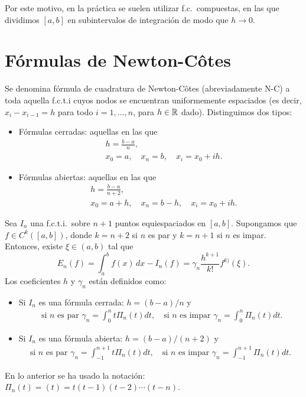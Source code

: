 Por este motivo, en la práctica se suelen utilizar f.c.\ compuestas, en
las que dividimos $[a,b]$ en subintervalos de integración de modo que
$h\to 0$.

\section{Fórmulas de Newton-Côtes}
\label{sec:formulas-de-newton}

\begin{definition}
  \label{def:1}
  Se denomina fórmula de cuadratura de Newton-Côtes (abreviadamente
  N-C) a toda aquella f.c.t.i cuyos nodos se encuentran
  uniformemente espaciados (es decir, $x_{i}-x_{i-1}=h$ para todo
  $i=1,\dots,n$, para $h\in\operatorname{{\mathbb R}}$ dado). Distinguimos dos tipos:
  \begin{itemize}
  \item Fórmulas cerradas: aquellas en las que
    \begin{align*}
      &h=\frac{b-a}{n}, \\
      &x_0=a, \quad x_n=b, \quad x_i=x_0 + i h.
    \end{align*}
  \item Fórmulas abiertas: aquellas en las que
    \begin{align*}
      &h=\frac{b-a}{n+2}, \\
      &x_0=a+h, \quad x_n=b- h, \quad x_i=x_0 + i h.
    \end{align*}
  \end{itemize}
\end{definition}

\begin{theorem}
  \label{thm:error.formulas-nc}
  Sea $I_n$ una f.c.t.i.\ sobre $n+1$ puntos equiespaciados en
  $[a,b]$. Supongamos que $f\in C^k([a,b])$, donde $k=n+2$ si $n$ es par
  y $k=n+1$ si $n$ es impar. Entonces, existe $\xi\in(a,b)$ tal que
  \begin{equation}
    \label{eq:error-formulas-nc}
    E_n(f)=\int_a^bf(x)\,dx - I_n(f)
    = \gamma_n \frac{h^{k+1}}{k!}f^{k)}(\xi).
  \end{equation}
  Los coeficientes $h$ y $\gamma_n$ están definidos como:
  \begin{itemize}
  \item Si $I_n$ es una fórmula cerrada: $h=(b-a)/n$ y
    \begin{align*}
      \text{ si $n$ es par }
      \gamma_n=\int_0^n t \Pi_n(t) dt,
      \quad \text{si $n$ es impar }
      \gamma_n=\int_0^n \Pi_n(t) dt.
    \end{align*}
  \item Si $I_n$ es una fórmula abierta: $h=(b-a)/(n+2)$ y
    \begin{align*}
      \text{si $n$ es par }
      \gamma_n=\int_{-1}^{n+1} t \Pi_n(t) dt,
      \quad \text{si $n$ es impar }
      \gamma_n=\int_{-1}^{n+1} \Pi_n(t) dt.
    \end{align*}
  \end{itemize}
  En lo anterior se ha usado la notación:
  $\Pi_n(t)=(t)=t(t-1)(t-2)\cdots (t-n)$.
\end{theorem}


